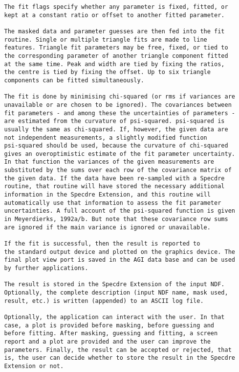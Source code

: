 \begin{description}
\begin{verbatim}
   The fit flags specify whether any parameter is fixed, fitted, or
   kept at a constant ratio or offset to another fitted parameter.

   The masked data and parameter guesses are then fed into the fit
   routine. Single or multiple triangle fits are made to line
   features. Triangle fit parameters may be free, fixed, or tied to
   the corresponding parameter of another triangle component fitted
   at the same time. Peak and width are tied by fixing the ratios,
   the centre is tied by fixing the offset. Up to six triangle
   components can be fitted simultaneously.

   The fit is done by minimising chi-squared (or rms if variances are
   unavailable or are chosen to be ignored). The covariances between
   fit parameters - and among these the uncertainties of parameters -
   are estimated from the curvature of psi-squared. psi-squared is
   usually the same as chi-squared. If, however, the given data are
   not independent measurements, a slightly modified function
   psi-squared should be used, because the curvature of chi-squared
   gives an overoptimistic estimate of the fit parameter uncertainty.
   In that function the variances of the given measurements are
   substituted by the sums over each row of the covariance matrix of
   the given data. If the data have been re-sampled with a Specdre
   routine, that routine will have stored the necessary additional
   information in the Specdre Extension, and this routine will
   automatically use that information to assess the fit parameter
   uncertainties. A full account of the psi-squared function is given
   in Meyerdierks, 1992a/b. But note that these covariance row sums
   are ignored if the main variance is ignored or unavailable.

   If the fit is successful, then the result is reported to
   the standard output device and plotted on the graphics device. The
   final plot view port is saved in the AGI data base and can be used
   by further applications.

   The result is stored in the Specdre Extension of the input NDF.
   Optionally, the complete description (input NDF name, mask used,
   result, etc.) is written (appended) to an ASCII log file.

   Optionally, the application can interact with the user. In that
   case, a plot is provided before masking, before guessing and
   before fitting. After masking, guessing and fitting, a screen
   report and a plot are provided and the user can improve the
   parameters. Finally, the result can be accepted or rejected, that
   is, the user can decide whether to store the result in the Specdre
   Extension or not.


\end{verbatim}
\end{description}
